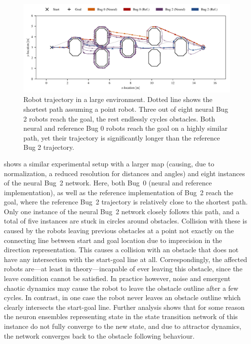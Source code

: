 \documentclass[letterpaper,10pt,conference]{ieeeconf}
\begin{document}
\begin{figure}
	\centering
	\includegraphics{media/vis_traj_map_02b_bug_0_neural_bug_0_ref_bug_2_neural_bug_2_ref.pdf}
	\caption{Robot trajectory in a large environment. Dotted line shows the shortest path assuming a point robot. Three out of eight neural Bug 2 robots reach the goal, the rest endlessly cycles obstacles. Both neural and reference Bug 0 robots reach the goal on a highly similar path, yet their trajectory is significantly longer than the reference Bug 2 trajectory.}
	\label{fig:experiment_2_trajectory}
\end{figure}
 shows a similar experimental setup with a larger map (causing, due to normalization, a reduced resolution for distances and angles) and eight instances of the neural Bug~2 network. Here, both Bug~0 (neural and reference implementation), as well as the reference implementation of Bug~2 reach the goal, where the reference Bug~2 trajectory is relatively close to the shortest path. Only one instance of the neural Bug~2 network closely follows this path, and a total of five instances are stuck in circles around obstacles. Collision with these is caused by the robots leaving previous obstacles at a point not exactly on the connecting line between start and goal location due to imprecision in the direction representation. This causes a collision with an obstacle that does not have any intersection with the start-goal line at all. Correspondingly, the affected robots are---at least in theory---incapable of ever leaving this obstacle, since the leave condition cannot be satisfied. In practice however, noise and emergent chaotic dynamics may cause the robot to leave the obstacle outline after a few cycles. In contrast, in one case the robot never leaves an obstacle outline which clearly intersects the start-goal line. Further analysis shows that for some reason the neuron ensembles representing state in the state transition network of this instance do not fully converge to the new state, and due to attractor dynamics, the network converges back to the obstacle following behaviour.
\end{document}
